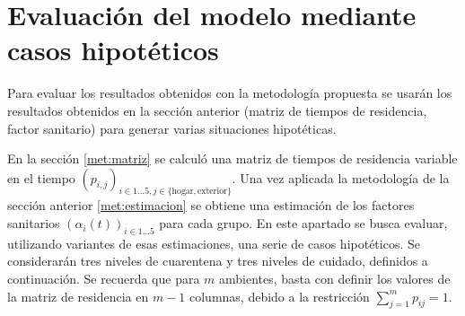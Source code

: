 \section{Evaluación del modelo mediante casos hipotéticos} \label{met:evaluacion}

Para evaluar los resultados obtenidos con la metodología propuesta se usarán los resultados obtenidos en la sección anterior (matriz de tiempos de residencia, factor sanitario) para generar varias situaciones hipotéticas.






En la sección \ref{met:matriz} se calculó una matriz de tiempos de residencia variable en el tiempo \((p_{i,j})_{i \in 1\dots 5, j \in \{ \text{hogar}, \text{exterior}\}}\).  Una vez aplicada la metodología de la sección anterior \ref{met:estimacion} se obtiene una estimación de los factores sanitarios \((\alpha_i(t))_{i \in 1 \dots 5}\) para cada grupo. En este apartado se busca evaluar, utilizando variantes de esas estimaciones, una serie de casos hipotéticos. Se considerarán tres niveles de cuarentena y tres niveles de cuidado, definidos a continuación. Se recuerda que para \(m\) ambientes, basta con definir los valores de la matriz de residencia en \(m-1\) columnas, debido a la restricción \(\sum_{j = 1}^m p_{ij} = 1\). 

